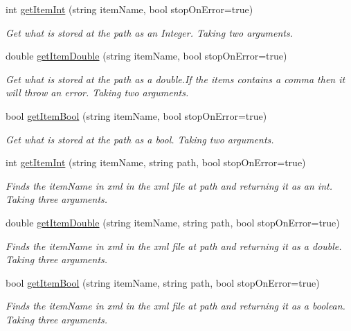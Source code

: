 \begin{DoxyCompactItemize}
int \mbox{\hyperlink{class_file_information_a76a366ed6ed009ca5456bee65c220cbd}{get\+Item\+Int}} (string item\+Name, bool stop\+On\+Error=true)
\begin{DoxyCompactList}\small\item\em Get what is stored at the path as an Integer. Taking two arguments. \end{DoxyCompactList}\item 
double \mbox{\hyperlink{class_file_information_aa2cba014484d7cfb481c302e20467692}{get\+Item\+Double}} (string item\+Name, bool stop\+On\+Error=true)
\begin{DoxyCompactList}\small\item\em Get what is stored at the path as a double.\+If the items contains a comma then it will throw an error. Taking two arguments. \end{DoxyCompactList}\item 
bool \mbox{\hyperlink{class_file_information_a1e9c6e7a91a72a839f3bb5d0430b1cfa}{get\+Item\+Bool}} (string item\+Name, bool stop\+On\+Error=true)
\begin{DoxyCompactList}\small\item\em Get what is stored at the path as a bool. Taking two arguments. \end{DoxyCompactList}\item 
int \mbox{\hyperlink{class_file_information_a90707864460a1e36c7219732ed5e628f}{get\+Item\+Int}} (string item\+Name, string path, bool stop\+On\+Error=true)
\begin{DoxyCompactList}\small\item\em Finds the item\+Name in xml in the xml file at path and returning it as an int. Taking three arguments. \end{DoxyCompactList}\item 
double \mbox{\hyperlink{class_file_information_a7663ef7e1872b1dc1004c2282cccf04c}{get\+Item\+Double}} (string item\+Name, string path, bool stop\+On\+Error=true)
\begin{DoxyCompactList}\small\item\em Finds the item\+Name in xml in the xml file at path and returning it as a double. Taking three arguments. \end{DoxyCompactList}\item 
bool \mbox{\hyperlink{class_file_information_a3b20f9677af078231820adefd319dd4d}{get\+Item\+Bool}} (string item\+Name, string path, bool stop\+On\+Error=true)
\begin{DoxyCompactList}\small\item\em Finds the item\+Name in xml in the xml file at path and returning it as a boolean. Taking three arguments. \end{DoxyCompactList}\item 

\end{DoxyCompactItemize}
